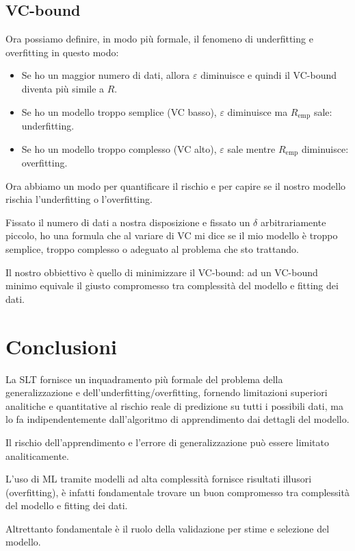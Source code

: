 \subsection{VC-bound}
Ora possiamo definire, in modo pi\`u formale, il fenomeno di underfitting e overfitting in questo modo:
\begin{itemize}
	\item Se ho un maggior numero di dati, allora $\varepsilon$ diminuisce e quindi il VC-bound diventa pi\`u simile a $R$.
	\item Se ho un modello troppo semplice (VC basso), $\varepsilon$ diminuisce ma $R_\text{emp}$ sale: underfitting.
	\item Se ho un modello troppo complesso (VC alto), $\varepsilon$ sale mentre $R_\text{emp}$ diminuisce: overfitting.
\end{itemize}
Ora abbiamo un modo per quantificare il rischio e per capire se il nostro modello rischia l'underfitting o l'overfitting.

Fissato il numero di dati a nostra disposizione e fissato un $\delta$ arbitrariamente piccolo, ho una formula che al
variare di VC mi dice se il mio modello \`e troppo semplice, troppo complesso o adeguato al problema che sto trattando.

Il nostro obbiettivo \`e quello di minimizzare il VC-bound: ad un VC-bound minimo equivale il giusto compromesso tra
complessit\`a del modello e fitting dei dati.

\section{Conclusioni}
La SLT fornisce un inquadramento pi\`u formale del problema della generalizzazione e dell'underfitting/overfitting,
fornendo limitazioni superiori analitiche e quantitative al rischio reale di predizione su tutti i possibili dati, ma
lo fa indipendentemente dall'algoritmo di apprendimento dai dettagli del modello.

Il rischio dell'apprendimento e l'errore di generalizzazione pu\`o essere limitato analiticamente.

L'uso di ML tramite modelli ad alta complessit\`a fornisce risultati illusori (overfitting), \`e infatti fondamentale
trovare un buon compromesso tra complessit\`a del modello e fitting dei dati.

Altrettanto fondamentale \`e il ruolo della validazione per stime e selezione del modello.
